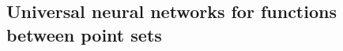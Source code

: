 \documentclass[12pt]{article}
\newcommand{\R}{\mathbb R}
\newtheorem{theorem}{Theorem}[section]
\begin{document}


\subsection{Universal neural networks for functions between point sets}
\label{subsec:point-set-functions}
\end{document}
